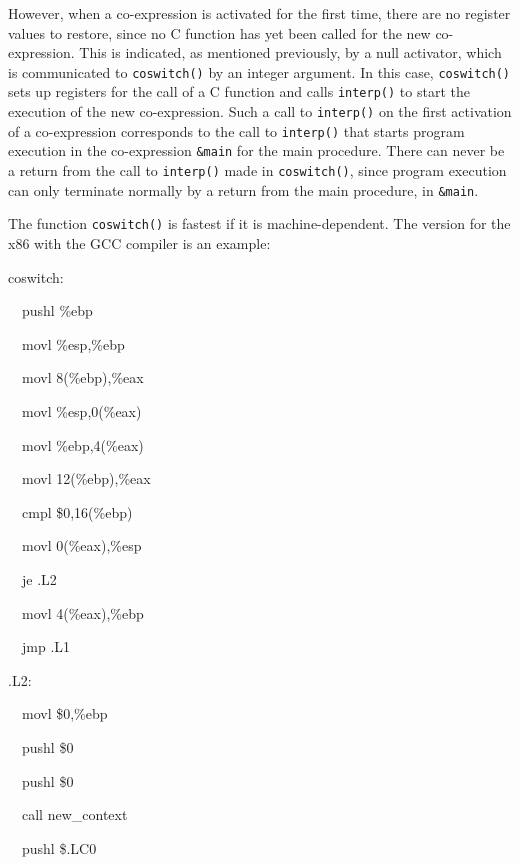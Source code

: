 However, when a co-expression is activated for the first time, there
are no register values to restore, since no C function has yet been
called for the new co-expression. This is indicated, as mentioned
previously, by a null activator, which is communicated to
\texttt{coswitch()} by an integer argument. In this case,
\texttt{coswitch()} sets up registers for the call of a C function and
calls \texttt{interp()} to start the execution of the new
co-expression.  Such a call to \texttt{interp()} on the first
activation of a co-expression corresponds to the call to
\texttt{interp()} that starts program execution in the co-expression
\texttt{\&main} for the main procedure. There can never be a return
from the call to \texttt{interp()} made in \texttt{coswitch()}, since
program execution can only terminate normally by a return from the
main procedure, in \texttt{\&main}.

The function \texttt{coswitch()} is fastest if it is
machine-dependent. The version for the x86 with the GCC compiler is an
example:

{\ttfamily\mdseries
coswitch:}

{\ttfamily\mdseries
\ \ pushl \%ebp}

{\ttfamily\mdseries
\ \ movl \%esp,\%ebp}

{\ttfamily\mdseries
\ \ movl 8(\%ebp),\%eax}

{\ttfamily\mdseries
\ \ movl \%esp,0(\%eax)}

{\ttfamily\mdseries
\ \ movl \%ebp,4(\%eax)}

{\ttfamily\mdseries
\ \ movl 12(\%ebp),\%eax}

{\ttfamily\mdseries
\ \ cmpl \$0,16(\%ebp)}

{\ttfamily\mdseries
\ \ movl 0(\%eax),\%esp}

{\ttfamily\mdseries
\ \ je .L2}


\bigskip

{\ttfamily\mdseries
\ \ movl 4(\%eax),\%ebp}

{\ttfamily\mdseries
\ \ jmp .L1}


\bigskip

{\ttfamily\mdseries
.L2:}

{\ttfamily\mdseries
\ \ movl \$0,\%ebp}

{\ttfamily\mdseries
\ \ pushl \$0}

{\ttfamily\mdseries
\ \ pushl \$0}

{\ttfamily\mdseries
\ \ call new\_context}

{\ttfamily\mdseries
\ \ pushl \$.LC0}


